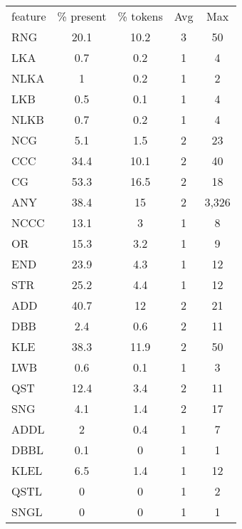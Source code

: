 \begin{center}
\begin{tabular}{lcccc}
\toprule
feature & \% present & \% tokens & Avg & Max \\ 
RNG & 20.1 & 10.2 & 3 & 50 \\ 
\midrule
LKA & 0.7 & 0.2 & 1 & 4 \\ 
\midrule
NLKA & 1 & 0.2 & 1 & 2 \\ 
\midrule
LKB & 0.5 & 0.1 & 1 & 4 \\ 
\midrule
NLKB & 0.7 & 0.2 & 1 & 4 \\ 
\midrule
NCG & 5.1 & 1.5 & 2 & 23 \\ 
\midrule
CCC & 34.4 & 10.1 & 2 & 40 \\ 
\midrule
CG & 53.3 & 16.5 & 2 & 18 \\ 
\midrule
ANY & 38.4 & 15 & 2 & 3,326 \\ 
\midrule
NCCC & 13.1 & 3 & 1 & 8 \\ 
\midrule
OR & 15.3 & 3.2 & 1 & 9 \\ 
\midrule
END & 23.9 & 4.3 & 1 & 12 \\ 
\midrule
STR & 25.2 & 4.4 & 1 & 12 \\ 
\midrule
ADD & 40.7 & 12 & 2 & 21 \\ 
\midrule
DBB & 2.4 & 0.6 & 2 & 11 \\ 
\midrule
KLE & 38.3 & 11.9 & 2 & 50 \\ 
\midrule
LWB & 0.6 & 0.1 & 1 & 3 \\ 
\midrule
QST & 12.4 & 3.4 & 2 & 11 \\ 
\midrule
SNG & 4.1 & 1.4 & 2 & 17 \\ 
\midrule
ADDL & 2 & 0.4 & 1 & 7 \\ 
\midrule
DBBL & 0.1 & 0 & 1 & 1 \\ 
\midrule
KLEL & 6.5 & 1.4 & 1 & 12 \\ 
\midrule
QSTL & 0 & 0 & 1 & 2 \\ 
\midrule
SNGL & 0 & 0 & 1 & 1 \\ 
\midrule
\bottomrule
\end{tabular}
\end{center}
